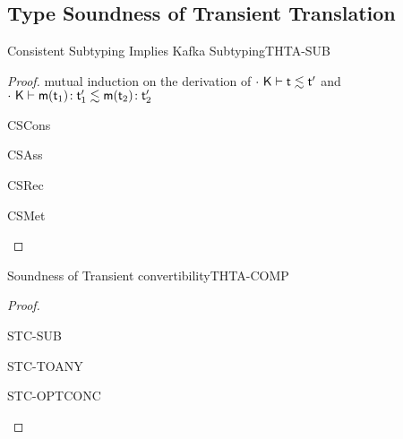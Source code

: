 \documentclass[acmlarge, anonymous, authordraft]{acmart}
\begin{document}
\subsection{Type Soundness of Transient Translation}

\begin{lemma}{Consistent Subtyping Implies Kafka Subtyping}{THTA-SUB}
  \begin{conds}
    \cond{$\ConSub\cdot\K{\t}{\tp}$}
    \cond{$\ConSub\cdot\K {\Mtype\m{\t[1]}{\tp[1]}} {\Mtype\m{\t[2]}{\tp[2]}}$}
    \cond{$\TR\K = \Kp$}
  \end{conds}
  \then\axiom{$\StrSub\cdot\Kp{\t[1]}{\tp[1]} \wedge \StrSub \cdot\Kp {\Mtype\m{\t[1]}{\tp[1]}} {\Mtype\m{\t[2]}{\tp[2]}}$}

  \begin{proof}{ mutual induction on the derivation of {$\ConSub\cdot\K\t\tp$} and $\ConSub\cdot\K {\Mtype\m{\t[1]}{\tp[1]}} {\Mtype\m{\t[2]}{\tp[2]}}$}

    \begin{case}{CSCons}
    \end{case}
    
    \begin{case}{CSAss}
    \end{case}
    
    \begin{case}{CSRec}
    \end{case}
    
    \begin{case}{CSMet}
    \end{case}
  \end{proof}
\end{lemma}

\begin{lemma}{Soundness of Transient convertibility}{THTA-COMP}
  \begin{conds}
    \cond{$\EnvTypeS\Env\K\e\t$}
    \cond{$\ep = \TRG{\e}\Env$}
    \cond{$\TR\K = \Kp$}
    \cond{$\TR\Env = \Envp$}
    \cond{$\EnvType\Envp\cdot\Kp{\ep}{\t}$}
  \end{conds}
  \then\axiom{$\EnvType\Envp\cdot\Kp{\TAG\e\Env{\tp}}{\kty\tp}$}

  \begin{proof}{ \indmsg{$\Convertible\K\t\tp$}}

  \begin{case}{STC-SUB}
  \end{case}

  \begin{case}{STC-TOANY}
  \end{case}

  \begin{case}{STC-OPTCONC}
  \end{case}

  \end{proof}
\end{lemma}
\end{document}
